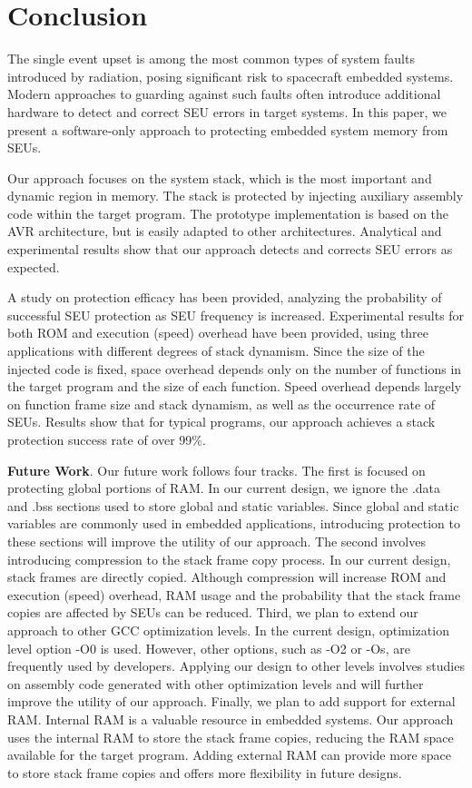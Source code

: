 \vspace{-20pt}
\section{Conclusion}\label{sec:conclusion}
\vspace{-10pt}
The single event upset is among the most common types of system faults introduced by radiation, posing significant risk to spacecraft embedded systems. Modern approaches to guarding against such faults often introduce additional hardware to detect and correct SEU errors in target systems. In this paper, we present a software-only approach to protecting embedded system memory from SEUs. 

Our approach focuses on the system stack, which is the most important and dynamic region in memory. The stack is protected by injecting auxiliary assembly code within the target program. The prototype implementation is based on the AVR architecture, but is easily adapted to other architectures. Analytical and experimental results show that our approach detects and corrects SEU errors as expected. 

A study on protection efficacy has been provided, analyzing the probability of successful SEU protection as SEU frequency is increased. Experimental results for both ROM and execution (speed) overhead have been provided, using three applications with different degrees of stack dynamism. Since the size of the injected code is fixed, space overhead depends only on the number of functions in the target program and the size of each function. Speed overhead depends largely on function frame size and stack dynamism, as well as the occurrence rate of SEUs. Results show that for typical programs, our approach achieves a stack protection success rate of over 99\%.

{\bf Future Work}. Our future work follows four tracks. The first is focused on protecting global portions of RAM. In our current design, we ignore the .data and .bss sections used to store global and static variables. Since global and static variables are commonly used in embedded applications, introducing protection to these sections will improve the utility of our approach. The second involves introducing compression to the stack frame copy process. In our current design, stack frames are directly copied. Although compression will increase ROM and execution (speed) overhead, RAM usage and the probability that the stack frame copies are affected by SEUs can be reduced. Third, we plan to extend our approach to other GCC optimization levels. In the current design, optimization level option -O0 is used. However, other options, such as -O2 or -Os, are frequently used by developers. Applying our design to other levels involves studies on assembly code generated with other optimization levels and will further improve the utility of our approach. Finally, we plan to add support for external RAM. Internal RAM is a valuable resource in embedded systems. Our approach uses the internal RAM to store the stack frame copies, reducing the RAM space available for the target program. Adding external RAM can provide more space to store stack frame copies and offers more flexibility in future designs.

